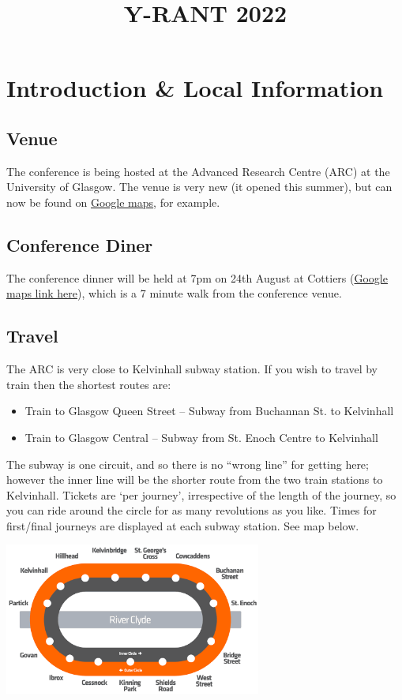 \documentclass[booklet]{ConferenceMaterials}
\title{Y-RANT 2022}
\theoremstyle{definition}
\begin{document}
\maketitle

\section*{Introduction \& Local Information}
\subsection*{Venue}
The conference is being hosted at the Advanced Research Centre (ARC) at the University of Glasgow.  The venue is very new (it opened this summer), but can now be found on \href{https://goo.gl/maps/ibBpC53hhvSWkdeQ7}{Google maps}, for example.
\subsection*{Conference Diner}
The conference dinner will be held at 7pm on 24th August at Cottiers (\href{https://goo.gl/maps/q1pxzEJ8YV2ZNNCu5}{Google maps link here}), which is a 7 minute walk from the conference venue.

\subsection*{Travel}
The ARC is very close to Kelvinhall subway station.  If you wish to travel by train then the shortest routes are:
\begin{itemize}
    \item Train to Glasgow Queen Street -- Subway from Buchannan St. to Kelvinhall
    \item Train to Glasgow Central -- Subway from St. Enoch Centre to Kelvinhall
\end{itemize}
The subway is one circuit, and so there is no ``wrong line'' for getting here; however the inner line will be the shorter route from the two train stations to Kelvinhall.  Tickets are `per journey', irrespective of the length of the journey, so you can ride around the circle for as many revolutions as you like.  Times for first/final journeys are displayed at each subway station. See map below.

\vspace{10pt}
\begin{center}\includegraphics[height=5cm]{img/Glasgow_Subway_map.png}\end{center}
\vspace{10pt}
\end{document}

